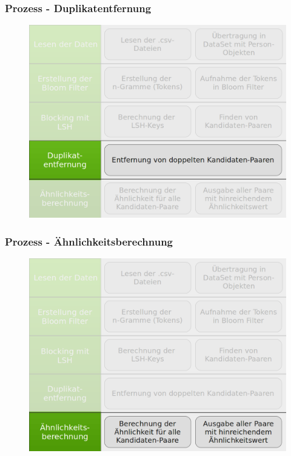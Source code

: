 \documentclass{beamer}
\begin{document}
    \begin{frame}
    		\frametitle{Prozess - Duplikatentfernung}
    		\begin{figure}[H]
    			\includegraphics[width=\textwidth]{graphics/process_4.png}
    		\end{figure}
    \end{frame}
    
    \begin{frame}
    		\frametitle{Prozess - Ähnlichkeitsberechnung}
    		\begin{figure}[H]
    			\includegraphics[width=\textwidth]{graphics/process_5.png}
    		\end{figure}
    \end{frame}
    
\end{document}
